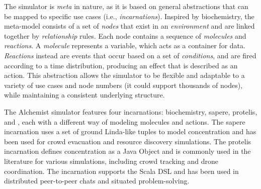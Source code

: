 The simulator is \emph{meta} in nature, 
 as it is based on general abstractions 
 that can be mapped to specific use cases (i.e., \emph{incarnations}).
% 
Inspired by biochemistry, 
 the meta-model consists of a set of \emph{nodes} 
 that exist in an \emph{environment} and are linked together by \emph{relationship} rules. 
 Each node contains a sequence of \emph{molecules} and \emph{reactions}. 
%
 A \emph{molecule} represents a variable, 
 which acts as a container for data. 
 \emph{Reactions} instead are events that occur based 
 on a set of \emph{conditions}, 
 and are fired according to a time distribution, 
 producing an effect that is described as an action. 
This abstraction allows the simulator to be flexible 
 and adaptable to a variety of use cases and node numbers 
 (it could support thousands of nodes), 
 while maintaining a consistent underlying structure.

 The Alchemist simulator features four incarnations: 
  biochemistry, sapere, protelis, and \scafi{}, 
  each with a different way of modeling molecules and actions. 
The sapere incarnation uses a set of ground Linda-like tuples 
 to model concentration and has been used for crowd evacuation and resource discovery simulations. 
The protelis incarnation defines concentration as a Java Object and is commonly used in the literature for various simulations, 
 including crowd tracking and drone coordination. 
The \scafi{} incarnation supports the \scafi{} Scala DSL 
 and has been used in distributed peer-to-peer chats and situated problem-solving.

